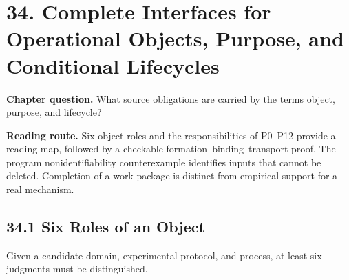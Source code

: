 \documentclass[
  english,
  11pt,
  oneside]{book}
\begin{document}
\chapter{34. Complete Interfaces for Operational Objects, Purpose, and Conditional Lifecycles}\label{ch-34}

\textbf{Chapter question.} What source obligations are carried by the terms object, purpose, and lifecycle?

\textbf{Reading route.} Six object roles and the responsibilities of P0--P12 provide a reading map, followed by a checkable formation--binding--transport proof. The program nonidentifiability counterexample identifies inputs that cannot be deleted. Completion of a work package is distinct from empirical support for a real mechanism.

\section{34.1 Six Roles of an Object}\label{six-roles-of-an-object}

Given a candidate domain, experimental protocol, and process, at least six judgments must be distinguished.
\end{document}
